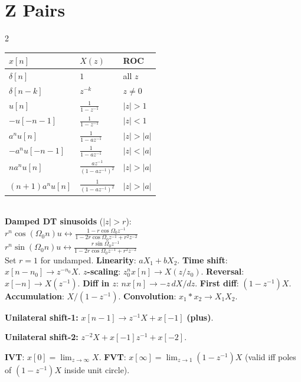 \documentclass[11pt]{extarticle}
\newcommand{\pairsection}[4]{%
  \needspace{2.8in}%
  \columnratio{#1}%
  \section*{#2}%
  \begin{paracol}{2}%
  #3%
  \switchcolumn%
  #4%
  \end{paracol}%
  \par\vspace{4pt}}
\begin{document}
\pairsection{0.34}{Z Pairs}{%
\begin{tabular}{@{}l l l@{}}
\toprule
$x[n]$ & $X(z)$ & ROC \\
\midrule
$\delta[n]$ & $1$ & all $z$ \\
$\delta[n{-}k]$ & $z^{-k}$ & $z\ne 0$ \\
$u[n]$ & $\tfrac{1}{1-z^{-1}}$ & $|z|{>}1$ \\
$-u[-n{-}1]$ & $\tfrac{1}{1-z^{-1}}$ & $|z|{<}1$ \\
$a^n u[n]$ & $\tfrac{1}{1-az^{-1}}$ & $|z|{>}|a|$ \\
$-a^n u[-n{-}1]$ & $\tfrac{1}{1-az^{-1}}$ & $|z|{<}|a|$ \\
$na^n u[n]$ & $\tfrac{az^{-1}}{(1-az^{-1})^2}$ & $|z|{>}|a|$ \\
$(n{+}1)a^n u[n]$ & $\tfrac{1}{(1-az^{-1})^2}$ & $|z|{>}|a|$ \\
\bottomrule
\end{tabular}\\[4pt]
\textbf{Damped DT sinusoids} ($|z|>r$):\\[1pt]
{\footnotesize
$r^n\!\cos(\Omega_0 n)u \!\leftrightarrow\! \tfrac{1-r\cos\Omega_0 z^{-1}}{1-2r\cos\Omega_0 z^{-1}+r^2 z^{-2}}$\\[2pt]
$r^n\!\sin(\Omega_0 n)u \!\leftrightarrow\! \tfrac{r\sin\Omega_0 z^{-1}}{1-2r\cos\Omega_0 z^{-1}+r^2 z^{-2}}$\\[2pt]
Set $r=1$ for undamped.
}%
}{%
\textbf{Linearity}: $aX_1+bX_2$. \textbf{Time shift}: $x[n{-}n_0]\to z^{-n_0}X$. \textbf{$z$-scaling}: $z_0^n x[n]\to X(z/z_0)$. \textbf{Reversal}: $x[-n]\to X(z^{-1})$. \textbf{Diff in $z$}: $nx[n]\to -z\,dX/dz$. \textbf{First diff}: $(1-z^{-1})X$. \textbf{Accumulation}: $X/(1-z^{-1})$. \textbf{Convolution}: $x_1*x_2\to X_1X_2$.

\textbf{Unilateral shift-1:} $x[n{-}1]\to z^{-1}X+x[-1]$ \textbf{(plus)}.

\textbf{Unilateral shift-2:} $z^{-2}X+x[-1]z^{-1}+x[-2]$.

\textbf{IVT}: $x[0]=\lim_{z\to\infty}X$. \textbf{FVT}: $x[\infty]=\lim_{z\to 1}(1-z^{-1})X$ (valid iff poles of $(1-z^{-1})X$ inside unit circle).%
}
\end{document}
